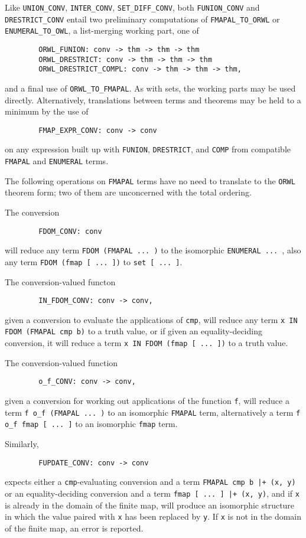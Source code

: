 Like {\tt UNION_CONV}, {\tt INTER_CONV}, {\tt SET_DIFF_CONV}, both
{\tt FUNION_CONV} and {\tt DRESTRICT_CONV} entail two preliminary
computations of {\tt FMAPAL_TO_ORWL} or {\tt ENUMERAL_TO_OWL}, a list-merging
working part, one of
\begin{verbatim}
        ORWL_FUNION: conv -> thm -> thm -> thm
        ORWL_DRESTRICT: conv -> thm -> thm -> thm
        ORWL_DRESTRICT_COMPL: conv -> thm -> thm -> thm,
\end{verbatim}
and a final use of {\tt ORWL_TO_FMAPAL}. As with sets, the working parts
may be used directly. Alternatively, translations between terms and
theorems may be held to a minimum by the use of
\begin{verbatim}
        FMAP_EXPR_CONV: conv -> conv
\end{verbatim}
on any expression built up with {\tt FUNION}, {\tt DRESTRICT}, and {\tt COMP}
from compatible {\tt FMAPAL} and {\tt ENUMERAL} terms.

The following operations on {\tt FMAPAL} terms have no need to translate
to the {\tt ORWL} theorem form; two of them are unconcerned with the
total ordering.

The conversion
\begin{verbatim}
        FDOM_CONV: conv
\end{verbatim}
will reduce any term {\tt FDOM (FMAPAL ...\ )} to the isomorphic
{\tt ENUMERAL ...\ }, also any term {\tt FDOM (fmap [ ...\ ])} to
{\tt set [ ...\ ]}.

The conversion-valued functon
\begin{verbatim}
        IN_FDOM_CONV: conv -> conv,
\end{verbatim}
given a conversion to evaluate the applications of {\tt cmp}, will reduce any
term {\tt x IN FDOM (FMAPAL cmp b)} to a truth value, or if given an
equality-deciding conversion, it will reduce a term
{\tt x IN FDOM (fmap [ ...\ ])} to a truth value.

The conversion-valued function
\begin{verbatim}
        o_f_CONV: conv -> conv,
\end{verbatim}
given a conversion for working out applications of the function {\tt f},
will reduce a term {\tt f o_f (FMAPAL ...\ )} to an isomorphic {\tt FMAPAL}
term, alternatively a term {\tt f o_f fmap [ ...\ ]} to an isomorphic
{\tt fmap} term.

Similarly,
\begin{verbatim}
        FUPDATE_CONV: conv -> conv
\end{verbatim}
expects either a {\tt cmp}-evaluating conversion and a term
{\tt FMAPAL cmp b |+ (x, y)} or an equality-deciding conversion and a term
{\tt fmap [ ...\ ] |+ (x, y)}, and if {\tt x} is already in the domain of
the finite map, will produce an isomorphic structure in which the value
paired with {\tt x} has been replaced by {\tt y}. If {\tt x} is not in the
domain of the finite map, an error is reported.

